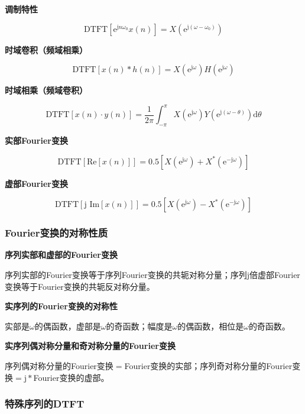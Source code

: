\documentclass[cn, hazy, blue, normal, 14pt]{elegantnote}
\begin{document}
\textbf{调制特性}

\begin{equation}
    \text{DTFT}[\text{e}^{\text{j}n\omega_0}x(n)]=X(\text{e}^{\text{j}(\omega-\omega_0)})
\end{equation}

\textbf{时域卷积（频域相乘）}

\begin{equation}
    \text{DTFT}[x(n)\ast h(n)]=X(\text{e}^{\text{j}\omega})H(\text{e}^{\text{j}\omega})
\end{equation}

\textbf{时域相乘（频域卷积）}

\begin{equation}
    \text{DTFT}[x(n)\cdot y(n)]=\frac{1}{2\pi}\int_{-\pi}^{\pi}{X(\text{e}^{\text{j}\omega})Y(\text{e}^{\text{j}(\omega-\theta)})\text{d}\theta}
\end{equation}

\textbf{实部Fourier变换}

\begin{equation}
    \text{DTFT}[\text{Re}[x(n)]]=0.5[X(\text{e}^{\text{j}\omega})+X^*(\text{e}^{-\text{j}\omega})]
\end{equation}

\textbf{虚部Fourier变换}

\begin{equation}
    \text{DTFT}[\text{j } \text{Im}[x(n)]]=0.5[X(\text{e}^{\text{j}\omega})-X^*(\text{e}^{-\text{j}\omega})]
\end{equation}

\subsubsection{Fourier变换的对称性质}

\textbf{序列实部和虚部的Fourier变换}

序列实部的Fourier变换等于序列Fourier变换的共轭对称分量；序列$\text{j}$倍虚部Fourier变换等于Fourier变换的共轭反对称分量。

\textbf{实序列的Fourier变换的对称性}

实部是$\omega$的偶函数，虚部是$\omega$的奇函数；幅度是$\omega$的偶函数，相位是$\omega$的奇函数。

\textbf{实序列偶对称分量和奇对称分量的Fourier变换}

序列偶对称分量的Fourier变换$=$Fourier变换的实部；序列奇对称分量的Fourier变换$=\text{j}*$Fourier变换的虚部。

\subsubsection{特殊序列的DTFT}
\end{document}
